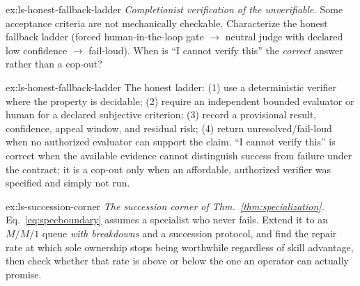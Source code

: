 \documentclass[11pt,a4paper]{article}
\theoremstyle{definition}
\theoremstyle{plain}
\newcounter{protocol}[section]
\begin{document}
\begin{pdexercise}[kind=Open,rating=3]{ex:ls-honest-fallback-ladder}
\emph{Completionist verification of the unverifiable.} Some
acceptance criteria are not mechanically checkable. Characterize the honest fallback
ladder (forced human-in-the-loop gate $\to$ neutral judge with declared low
confidence $\to$ fail-loud). When is ``I cannot verify this'' the \emph{correct}
answer rather than a cop-out?
\end{pdexercise}
\begin{pdsolution}{ex:ls-honest-fallback-ladder}
The honest ladder: (1) use a deterministic verifier where the property is decidable; (2) require an independent bounded evaluator or human for a declared subjective criterion; (3) record a provisional result, confidence, appeal window, and residual risk; (4) return unresolved/fail-loud when no authorized evaluator can support the claim. ``I cannot verify this'' is correct when the available evidence cannot distinguish success from failure under the contract; it is a cop-out only when an affordable, authorized verifier was specified and simply not run.
\end{pdsolution}
\begin{pdexercise}[kind=Open,rating=3]{ex:ls-succession-corner}
\emph{The succession corner of
Thm.~\ref{thm:specialization}.} Eq.~\ref{eq:specboundary} assumes a specialist who
never fails. Extend it to an $M/M/1$ queue \emph{with breakdowns} and a succession
protocol, and find the repair rate at which sole ownership stops being worthwhile regardless of
skill advantage, then check whether that rate is above or below the one an operator
can actually promise.
\end{pdexercise}
\end{document}
